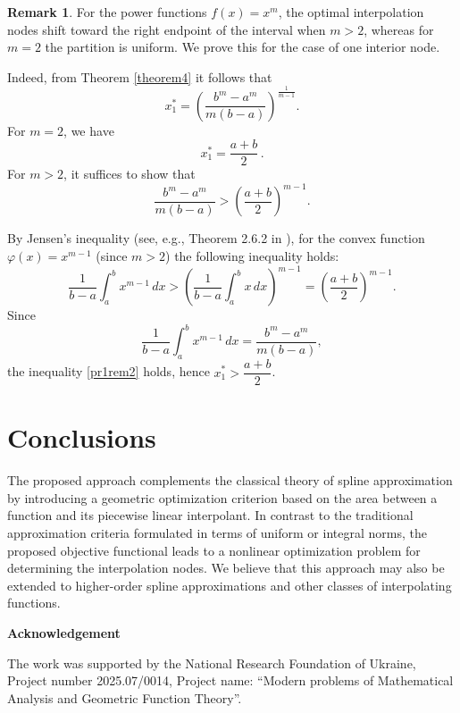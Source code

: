 \documentclass[amstex,16pt, amssymb]{article}
\theoremstyle{plain}
\theoremstyle{definition}
\newtheorem{remark}{Remark}[section]
\numberwithin{equation}{section}
\numberwithin{equation}{section}
\begin{document}

\begin{remark}
For the power functions $f(x)=x^m$, the optimal
interpolation nodes shift toward the right endpoint of the interval
when $m>2$, whereas for $m=2$ the partition is uniform. We prove this
for the case of one interior node.

Indeed, from Theorem \ref{theorem4} it follows that
$$
x_1^* = \left( \frac{b^m - a^m}{m(b-a)} \right)^{\frac{1}{m-1}}.
$$
For $m=2$, we have
$$
x_1^* = \frac{a+b}{2}\,.
$$
For $m>2$, it suffices to show that
\begin{equation}\label{pr1rem2}
\frac{b^m - a^m}{m(b-a)} > \left( \frac{a+b}{2} \right)^{m-1}. 
\end{equation}

By Jensen's inequality (see, e.g., Theorem 2.6.2 in \cite{Ransford}), for the convex function $\varphi(x)=x^{m-1}$
(since $m>2$) the following inequality holds:
$$
\frac{1}{b-a} \int_a^b x^{m-1}\,dx > \left( \frac{1}{b-a} \int_a^b
x\,dx \right)^{m-1} = \left( \frac{a+b}{2} \right)^{m-1}.
$$
Since
$$
\frac{1}{b-a} \int_a^b x^{m-1}\,dx = \frac{b^m - a^m}{m(b-a)},
$$
the inequality \eqref{pr1rem2} holds, hence $x_1^* > \dfrac{a+b}{2}$. 
\end{remark}

\section{Conclusions} 


The proposed approach complements the classical theory of spline approximation by introducing a geometric optimization criterion based on the area between a function and its piecewise linear interpolant. In contrast to the traditional approximation criteria formulated in terms of uniform or integral norms, the proposed objective functional leads to a nonlinear optimization problem for determining the interpolation nodes. We believe that this approach may also be extended to higher-order spline approximations and other classes of interpola\-ting functions.


\bigskip

\bigskip

\textbf{Acknowledgement}

The work was supported by the National Research Foundation of Ukraine, Project number 2025.07/0014, Project name: ``Modern problems of Ma\-thematical Analysis and Geometric Function Theory''.
\end{document}
